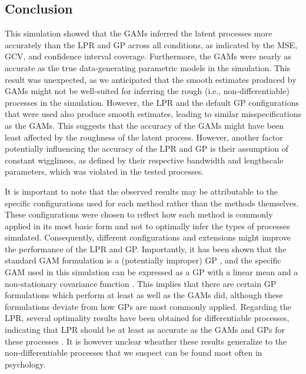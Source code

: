 \documentclass[man, floatsintext]{apa7}
\begin{document}
\subsection{Conclusion}

This simulation showed that the GAMs inferred
the latent processes more accurately than the LPR and GP across all conditions,
as indicated by the MSE, GCV, and confidence interval coverage. Furthermore,
the GAMs were nearly as accurate as the true data-generating parametric models
in the simulation. This result was unexpected, as we
anticipated that the smooth estimates produced by GAMs might not be well-suited
for inferring the rough (i.e., non-differentiable) processes in the
simulation. However, the LPR and the default GP configurations that were used
also produce smooth estimates, leading to
similar misspecifications as the GAMs. This suggests that the accuracy of the
GAMs might have been least affected by the roughness of the latent process.
However, another factor potentially influencing the accuracy of the LPR and GP
is their assumption of constant wiggliness, as defined by their respective
bandwidth and lengthscale parameters, which was violated in the tested
processes.

It is important to note that the observed results may be attributable to the
specific configurations used for each method rather than the methods
themselves. These configurations were chosen to reflect how each method is
commonly applied in its most basic form and not to optimally infer the types of
processes simulated. Consequently, different configurations and extensions
might improve the performance of the LPR and GP\@. Importantly, it has been
shown that the standard GAM formulation is a (potentially improper) GP
\parencite{wahba_improper_1978}, and the specific GAM used in this simulation
can be expressed as a GP with a linear mean and a non-stationary covariance
function \parencite{rasmussen_gaussian_2006}. This implies that there are
certain GP formulations which perform at least as well as the GAMs did,
although these formulations deviate from how GPs are most commonly applied.
Regarding the LPR, several optimality results have been obtained for
differentiable processes, indicating that LPR should be at least as
accurate as the GAMs and GPs for these processes
\parencite{fan_local_1997}. It is however unclear wheather these results
generalize to the non-differentiable processes that we suspect can be found
most often in psychology.
\end{document}
